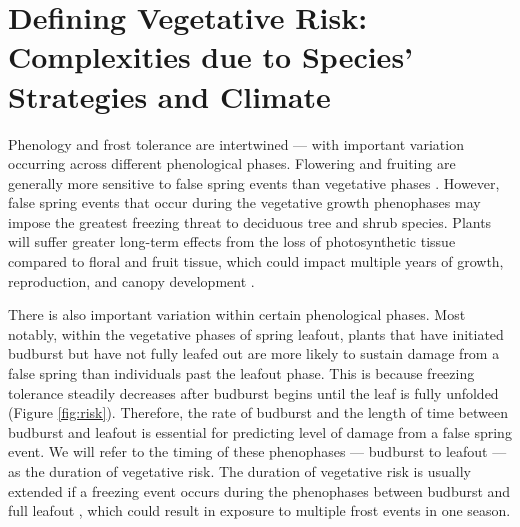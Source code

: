 \documentclass{article}\usepackage[]{graphicx}\usepackage[]{color}
\begin{document}
\section {Defining Vegetative Risk: Complexities due to Species' Strategies and Climate}
Phenology and frost tolerance are intertwined --- with important variation occurring across different phenological phases. Flowering and fruiting are generally more sensitive to false spring events than vegetative phases \citep{Augspurger2009, Lenz2013}.
However, false spring events that occur during the vegetative growth phenophases may impose the greatest freezing threat to deciduous tree and shrub species. Plants will suffer greater long-term effects from the loss of photosynthetic tissue compared to floral and fruit tissue, which could impact multiple years of growth, reproduction, and canopy development \citep{Sakai1987, Vitasse2014}. 

There is also important variation within certain phenological phases. Most notably, within the vegetative phases of spring leafout, plants that have initiated budburst but have not fully leafed out are more likely to sustain damage from a false spring than individuals past the leafout phase. This is because freezing tolerance steadily decreases after budburst begins until the leaf is fully unfolded \citep{Lenz2016} (Figure \ref{fig:risk}). Therefore, the rate of budburst and the length of time between budburst and leafout is essential for predicting level of damage from a false spring event. We will refer to the timing of these phenophases --- budburst to leafout --- as the duration of vegetative risk. The duration of vegetative risk is usually extended if a freezing event occurs during the phenophases between budburst and full leafout \citep{Augspurger2009}, which could result in exposure to multiple frost events in one season.
\end{document}

